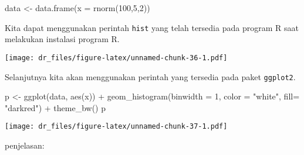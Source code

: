 \documentclass[
]{book}
\newenvironment{Shaded}{\begin{snugshade}}{\end{snugshade}}
\newcommand{\AttributeTok}[1]{\textcolor[rgb]{0.77,0.63,0.00}{#1}}
\newcommand{\DecValTok}[1]{\textcolor[rgb]{0.00,0.00,0.81}{#1}}
\newcommand{\FunctionTok}[1]{\textcolor[rgb]{0.00,0.00,0.00}{#1}}
\newcommand{\NormalTok}[1]{#1}
\newcommand{\OtherTok}[1]{\textcolor[rgb]{0.56,0.35,0.01}{#1}}
\newcommand{\SpecialCharTok}[1]{\textcolor[rgb]{0.00,0.00,0.00}{#1}}
\newcommand{\StringTok}[1]{\textcolor[rgb]{0.31,0.60,0.02}{#1}}
\begin{document}
\begin{Shaded}
\begin{Highlighting}[]
\NormalTok{data }\OtherTok{\textless{}{-}} \FunctionTok{data.frame}\NormalTok{(}\AttributeTok{x =} \FunctionTok{rnorm}\NormalTok{(}\DecValTok{100}\NormalTok{,}\DecValTok{5}\NormalTok{,}\DecValTok{2}\NormalTok{))}
\end{Highlighting}
\end{Shaded}

Kita dapat menggunakan perintah \texttt{hist} yang telah tersedia pada program R saat melakukan instalasi program R.

\begin{Shaded}
\end{Shaded}

\texttt{[image: dr\_files/figure-latex/unnamed-chunk-36-1.pdf]}

Selanjutnya kita akan menggunakan perintah yang tersedia pada paket \texttt{ggplot2}.

\begin{Shaded}
\begin{Highlighting}[]
\NormalTok{p }\OtherTok{\textless{}{-}} \FunctionTok{ggplot}\NormalTok{(data, }\FunctionTok{aes}\NormalTok{(x)) }\SpecialCharTok{+} 
  \FunctionTok{geom\_histogram}\NormalTok{(}\AttributeTok{binwidth =} \DecValTok{1}\NormalTok{, }
                 \AttributeTok{color =} \StringTok{"white"}\NormalTok{, }
                 \AttributeTok{fill=} \StringTok{"darkred"}\NormalTok{) }\SpecialCharTok{+}
  \FunctionTok{theme\_bw}\NormalTok{()}
\NormalTok{p}
\end{Highlighting}
\end{Shaded}

\texttt{[image: dr\_files/figure-latex/unnamed-chunk-37-1.pdf]}

penjelasan:
\end{document}
